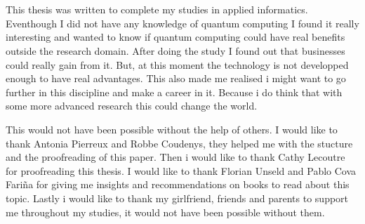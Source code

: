 
\chapter*{}
\label{ch:voorwoord}


This thesis was written to complete my studies in applied informatics. 
Eventhough I did not have any knowledge of quantum computing I found it really interesting and wanted to know if quantum computing could have real benefits outside the research domain.
After doing the study I found out that businesses could really gain from it. But, at this moment the technology is not developped enough to have real advantages.
This also made me realised i might want to go further in this discipline and make a career in it. Because i do think that with some more advanced research this could change the world.


This would not have been possible without the help of others.
I would like to thank Antonia Pierreux and Robbe Coudenys, they helped me with the stucture and the proofreading of this paper.
Then i would like to thank Cathy Lecoutre for proofreading this thesis.
I would like to thank Florian Unseld and Pablo Cova Fariña for giving me insights and recommendations on books to read about this topic.
Lastly i would like to thank my girlfriend, friends and parents to support me throughout my studies, it would not have been possible without them.
